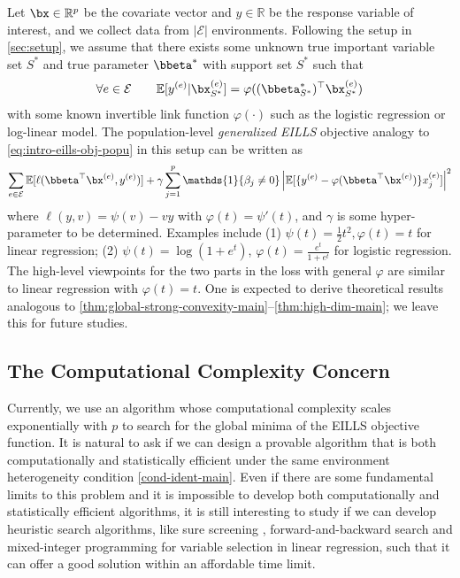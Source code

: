 \documentclass[10pt]{article}
\numberwithin{equation}{section}
\begin{document}
{Let $\bx \in \mathbb{R}^p$ be the covariate vector and $y\in \mathbb{R}$ be the response variable of interest, and we collect data from $|\mathcal{E}|$ environments. Following the setup in \cref{sec:setup}, we assume that there exists some unknown true important variable set $S^*$ and true parameter $\bbeta^*$ with support set $S^*$ such that
\begin{align*}
 \forall e\in \mathcal{E} \qquad \mathbb{E}[y^{(e)}|\bx_{S^*}^{(e)}] = \varphi((\bbeta^*_{S^*})^\top \bx_{S^*}^{(e)})
\end{align*} with some known invertible link function $\varphi(\cdot)$ such as the logistic regression or log-linear model. The population-level \emph{generalized EILLS} objective analogy to \eqref{eq:intro-eills-obj-popu} in this setup can be written as
\begin{align*}
    \sum_{e\in \mathcal{E}} \mathbb{E}[\ell(\bbeta^\top \bx^{(e)}, y^{(e)})] + \gamma \sum_{j=1}^p \mathds{1}\{\beta_j\neq 0\} \left|\mathbb{E}[\{y^{(e)}-\varphi(\bbeta^\top \bx^{(e)})\} x_j^{(e)}]\right|^2
\end{align*} where $\ell(y, v) = \psi(v) - vy$ with $\varphi(t) = \psi'(t)$, and $\gamma$ is some hyper-parameter to be determined. Examples include (1) $\psi(t) = \frac{1}{2}t^2, \varphi(t) = t$ for linear regression; (2) $\psi(t) = \log(1+e^t)$, $\varphi(t) = \frac{e^t}{1+e^{t}}$ for logistic regression. The high-level viewpoints for the two parts in the loss with general $\varphi$ are similar to linear regression with $\varphi(t)=t$. One is expected to derive theoretical results analogous to \cref{thm:global-strong-convexity-main}--\ref{thm:high-dim-main}; we leave this for future studies.

\subsection{The Computational Complexity Concern}

Currently, we use an algorithm whose computational complexity scales exponentially with $p$ to search for the global minima of the EILLS objective function. It is natural to ask if we can design a provable algorithm that is both computationally and statistically efficient under the same environment heterogeneity condition \cref{cond-ident-main}. Even if there are some fundamental limits to this problem and it is impossible to develop both computationally and statistically efficient algorithms, it is still interesting to study if we can develop heuristic search algorithms, like sure screening \citep{fan2008sure}, forward-and-backward search \citep{zhang2011adaptive} and mixed-integer programming \citep{bertsimas2016best} for variable selection in linear regression, such that it can offer a good solution within an affordable time limit.




}
\end{document}
